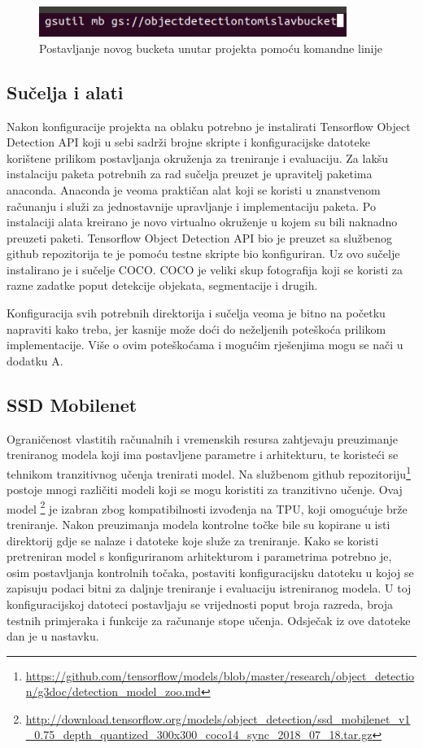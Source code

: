 \begin{figure}[htb]
    \centering
    \includegraphics[width=10cm]{img/Gsutil.png}
    \caption{Postavljanje novog bucketa unutar projekta pomoću komandne linije}
    \label{Gsutil}
\end{figure}

\subsection{Sučelja i alati}
Nakon konfiguracije projekta na oblaku potrebno je instalirati Tensorflow Object Detection API koji u sebi sadrži brojne skripte i konfiguracijske datoteke korištene prilikom postavljanja okruženja za treniranje i evaluaciju. 
Za lakšu instalaciju paketa potrebnih za rad sučelja preuzet je upravitelj paketima anaconda. Anaconda je veoma praktičan alat koji se koristi u znanstvenom računanju i služi za jednostavnije upravljanje i implementaciju paketa. 
Po instalaciji alata kreirano je novo virtualno okruženje u kojem su bili naknadno preuzeti paketi. Tensorflow Object Detection API bio je preuzet sa službenog github repozitorija te je pomoću testne skripte bio konfiguriran.
Uz ovo sučelje instalirano je i sučelje COCO. COCO je veliki skup fotografija koji se koristi za razne zadatke poput detekcije objekata, segmentacije i drugih.

Konfiguracija svih potrebnih direktorija i sučelja veoma je bitno na početku napraviti kako treba, jer kasnije može doći do neželjenih poteškoća prilikom implementacije. Više o ovim poteškoćama i mogućim rješenjima mogu se nači u dodatku A.

\subsection{SSD Mobilenet}
Ograničenost vlastitih računalnih i vremenskih resursa zahtjevaju preuzimanje treniranog modela koji ima postavljene parametre i arhitekturu, te koristeći se tehnikom 
tranzitivnog učenja trenirati model. Na službenom github repozitoriju\footnote{\url{https://github.com/tensorflow/models/blob/master/research/object_detection/g3doc/detection_model_zoo.md}}
postoje mnogi različiti modeli koji se mogu koristiti za tranzitivno učenje. Ovaj model \footnote{\url{http://download.tensorflow.org/models/object_detection/ssd_mobilenet_v1_0.75_depth_quantized_300x300_coco14_sync_2018_07_18.tar.gz}}
je izabran zbog kompatibilnosti izvođenja na TPU, koji omogućuje brže treniranje. Nakon preuzimanja modela kontrolne točke bile su kopirane u isti direktorij gdje se nalaze i datoteke koje služe za treniranje. 
Kako se koristi pretreniran model s konfiguriranom arhitekturom i parametrima potrebno je, osim postavljanja kontrolnih točaka, postaviti konfiguracijsku datoteku u kojoj se zapisuju podaci bitni za daljnje treniranje i
evaluaciju istreniranog modela. U toj konfiguracijskoj datoteci postavljaju se vrijednosti poput broja razreda, broja testnih primjeraka i funkcije za računanje stope učenja. 
Odsječak iz ove datoteke dan je u nastavku.

